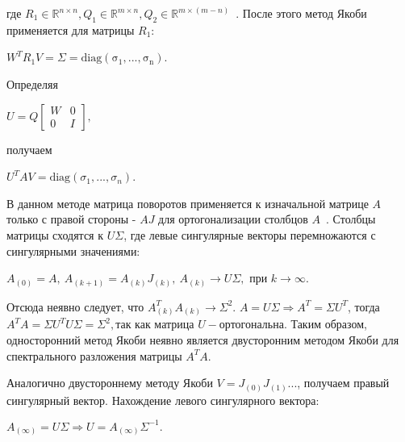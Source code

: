 где $R_1 \in \mathbb{R}^{n\times n}, Q_1 \in \mathbb{R}^{m\times n}, Q_2\in \mathbb{R}^{m\times (m-n)}$~\cite{Golub2013}. После этого метод Якоби применяется для матрицы $R_1$:
\begin{center}
    $W^TR_1V=\Sigma = \mathrm{diag(\sigma_1,...,\sigma_n)}$.
\end{center}
Определяя 
\begin{center}
    $U = Q\begin{bmatrix}
        W&0\\0&I
    \end{bmatrix},$    
\end{center}
получаем
\begin{center}
     $U^TAV = \mathrm{diag}(\sigma_1,...,\sigma_n)$.
\end{center}




В данном методе матрица поворотов применяется к изначальной матрице $A$ только с правой стороны - $AJ$ для ортогонализации столбцов $A$~\cite{Hestenes1958}.
Столбцы матрицы сходятся к $U\Sigma$, где левые сингулярные векторы перемножаются с сингулярными значениями:
\begin{center}
     $A_{(0)}=A,\ A_{(k+1)} = A_{(k)}J_{(k)},\ A_{(k)} \longrightarrow U\Sigma, \text{ при } k\to\infty$.
 \end{center}
 \begin{note}
     Отсюда неявно следует, что $A^T_{(k)}A_{(k)} \to \Sigma^2$. $A = U\Sigma \Rightarrow A^T = \Sigma U^T$, тогда $ A^TA = \Sigma U^TU\Sigma = \Sigma^2, \text{так как матрица } U -\text{ортогональна}.$ Таким образом, односторонний метод Якоби неявно является двусторонним методом Якоби для спектрального разложения матрицы $A^TA$.
 \end{note}
 Аналогично двустороннему методу Якоби $V = J_{(0)}J_{(1)}...$, получаем правый сингулярный вектор. Нахождение левого сингулярного вектора:
 \begin{center}
     $A_{(\infty)} = U\Sigma \Rightarrow U = A_{(\infty)}\Sigma^{-1}.$
 \end{center}

